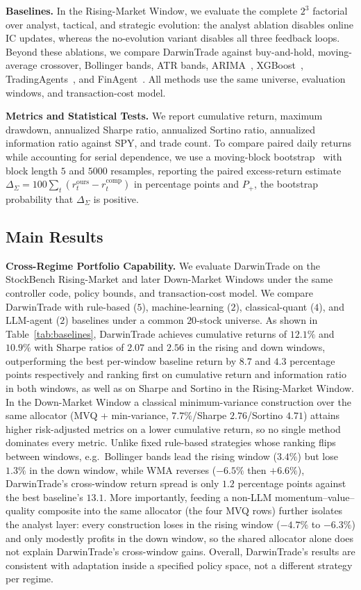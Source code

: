 \documentclass[letterpaper]{article}
\begin{document}
\textbf{Baselines.}\quad
In the Rising-Market Window, we evaluate the complete $2^3$ factorial over
analyst, tactical, and strategic evolution: the analyst ablation disables
online IC updates, whereas the no-evolution variant disables all three
feedback loops. Beyond these ablations, we compare DarwinTrade against
buy-and-hold, moving-average crossover, Bollinger bands, ATR bands,
ARIMA~\citep{box2015time}, XGBoost~\citep{chen2016xgboost},
TradingAgents~\citep{xiao2024tradingagents}, and
FinAgent~\citep{zhang2024finagent}. All methods use the same universe,
evaluation windows, and transaction-cost model.

\textbf{Metrics and Statistical Tests.}\quad
We report cumulative return, maximum drawdown, annualized Sharpe ratio,
annualized Sortino ratio, annualized information ratio against SPY, and trade
count. To compare paired daily returns while accounting for serial
dependence, we use a moving-block bootstrap~\citep{kuensch1989jackknife} with
block length $5$ and $5000$ resamples, reporting the paired excess-return
estimate
$\Delta_{\Sigma}=100\sum_t(r^{\mathrm{ours}}_t-r^{\mathrm{comp}}_t)$ in
percentage points and $P_+$, the bootstrap probability that
$\Delta_{\Sigma}$ is positive.

\subsection{Main Results}

\textbf{Cross-Regime Portfolio Capability.}\quad
We evaluate DarwinTrade on the StockBench Rising-Market and later Down-Market
Windows under the same controller code, policy bounds, and transaction-cost
model. We compare DarwinTrade with rule-based ($5$), machine-learning ($2$),
classical-quant ($4$), and LLM-agent ($2$) baselines under a common
$20$-stock universe. As shown in Table~\ref{tab:baselines}, DarwinTrade
achieves cumulative returns of $12.1\%$ and $10.9\%$ with Sharpe ratios of
$2.07$ and $2.56$ in the rising and down windows, outperforming the best
per-window baseline return by $8.7$ and $4.3$ percentage points respectively
and ranking first on cumulative return and information ratio in both
windows, as well as on Sharpe and Sortino in the Rising-Market Window. In
the Down-Market Window a classical minimum-variance construction over the
same allocator (MVQ + min-variance, $7.7\%$/Sharpe $2.76$/Sortino $4.71$)
attains higher risk-adjusted metrics on a lower cumulative return, so no
single method dominates every metric. Unlike fixed rule-based strategies
whose ranking flips between windows, e.g.\ Bollinger bands lead the rising
window ($3.4\%$) but lose $1.3\%$ in the down window, while WMA reverses
($-6.5\%$ then $+6.6\%$), DarwinTrade's cross-window return spread is only
$1.2$ percentage points against the best baseline's $13.1$. More
importantly, feeding a non-LLM momentum--value--quality composite into
the same allocator (the four MVQ rows) further isolates the analyst
layer: every construction loses in the rising window ($-4.7\%$ to
$-6.3\%$) and only modestly profits in the down window, so the shared
allocator alone does not explain DarwinTrade's cross-window gains. Overall, DarwinTrade's results are
consistent with adaptation inside a specified policy space, not a
different strategy per regime.
\end{document}
